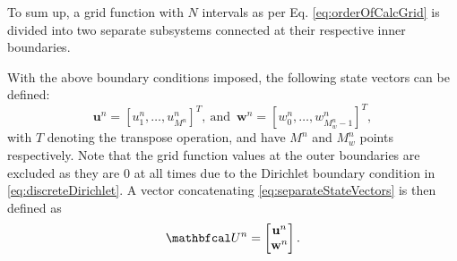 To sum up, a grid function with $N$ intervals as per Eq. \eqref{eq:orderOfCalcGrid} is divided into two separate subsystems connected at their respective inner boundaries. %



With the above boundary conditions imposed, the following state vectors can be defined:
\begin{equation}
    \label{eq:separateStateVectors}
     \mathbf{u}^n = [u_1^n, \hdots, u_{M^n}^n]^T\!, \  \text{and} \ \; \mathbf{w}^n = [w_0^n, \hdots, w_{M_w^n-1}^n]^T,
\end{equation}
with $T$ denoting the transpose operation, and have $M^n$ and $M_{w}^n$ points respectively. Note that the grid function values at the outer boundaries are excluded as they are 0 at all times due to the Dirichlet boundary condition in \eqref{eq:discreteDirichlet}. A vector concatenating \eqref{eq:separateStateVectors} is then defined as 
\begin{equation}\label{eq:fullState}
    \U^n = \begin{bmatrix}
        \mathbf{u}^n \\
        \mathbf{w}^n
    \end{bmatrix}.
\end{equation}

